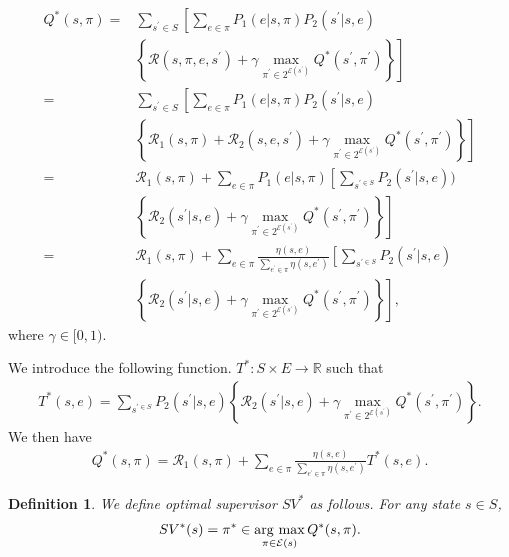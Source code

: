 \documentclass[letterpaper, 10 pt, conference]{ieeeconf}
\newtheorem{definition}{Definition}
\newcommand{\argmax}{\mathop{\rm arg~max}\limits}
\begin{document}
\begin{align}
  Q^{\ast}(s,\pi) = & \sum_{s^{\prime} \in S} \left[ \sum_{e \in \pi} P_1(e|s,\pi) P_2(s^{\prime}|s,e) \right. \nonumber \\
  & \left. \left \{ \mathcal{R}(s,\pi,e,s^{\prime}) + \gamma \max_{\pi^{\prime} \in 2^{\mathcal{E}(s^{\prime})}} Q^{\ast}(s^{\prime},\pi^{\prime}) \right \} \right] \nonumber \\
  = & \sum_{s^{\prime} \in S} \left[ \sum_{e \in \pi} P_1(e|s,\pi) P_2(s^{\prime}|s,e) \right. \nonumber \\
  & \left. \left \{ \mathcal{R}_1(s,\pi) + \mathcal{R}_2(s,e,s^{\prime}) + \gamma \max_{\pi^{\prime} \in 2^{\mathcal{E}(s^{\prime})}} Q^{\ast}(s^{\prime},\pi^{\prime}) \right \} \right] \nonumber \\
  = & \mathcal{R}_1(s,\pi) + \sum_{e \in \pi}P_1(e|s,\pi) \left[ \sum_{s^{\prime \in S}} P_2(s^{\prime}|s,e)) \right. \nonumber \\
  & \left. \left \{ \mathcal{R}_2(s^{\prime}|s,e) + \gamma \max_{\pi^{\prime} \in 2^{\mathcal{E}(s^{\prime})}} Q^{\ast}(s^{\prime}, \pi^{\prime}) \right \} \right] \nonumber \\
  = & \mathcal{R}_1(s,\pi) + \sum_{e \in \pi} \frac{\eta(s,e)}{\sum_{e^{\prime} \in \pi} \eta(s,e^{\prime})} \left[ \sum_{s^{\prime \in S}} P_2(s^{\prime}|s,e) \right. \nonumber \\
  & \left. \left \{ \mathcal{R}_2(s^{\prime}|s,e) + \gamma \max_{\pi^{\prime} \in 2^{\mathcal{E}(s^{\prime})}} Q^{\ast}(s^{\prime}, \pi^{\prime}) \right \} \right],
\end{align}
where $\gamma \in [0,1)$.

We introduce the following function. $T^{\ast} : S \times E \rightarrow \mathbb{R}$ such that
\begin{align}
  T^{\ast}(s,e) = \sum_{s^{\prime \in S}} P_2(s^{\prime}|s,e) \left \{ \mathcal{R}_2(s^{\prime}|s,e) + \gamma \max_{\pi^{\prime} \in 2^{\mathcal{E}(s^{\prime})}} Q^{\ast}(s^{\prime}, \pi^{\prime}) \right \}.
\end{align}
We then have
\begin{align}
  Q^{\ast}(s,\pi) = \mathcal{R}_1(s,\pi) + \sum_{e \in \pi} \frac{\eta(s,e)}{\sum_{e^{\prime} \in \pi} \eta(s,e^{\prime})} T^{\ast}(s,e).
\end{align}
\begin{definition}
We define optimal supervisor $SV^{\ast}$ as follows. For any state $s \in S$,
\begin{align}
  SV^{\ast}(s) = \pi^{\ast} \in \argmax_{\pi \in \mathcal{E}(s)} Q^{\ast}(s,\pi).
\end{align}
\end{definition}
\end{document}
